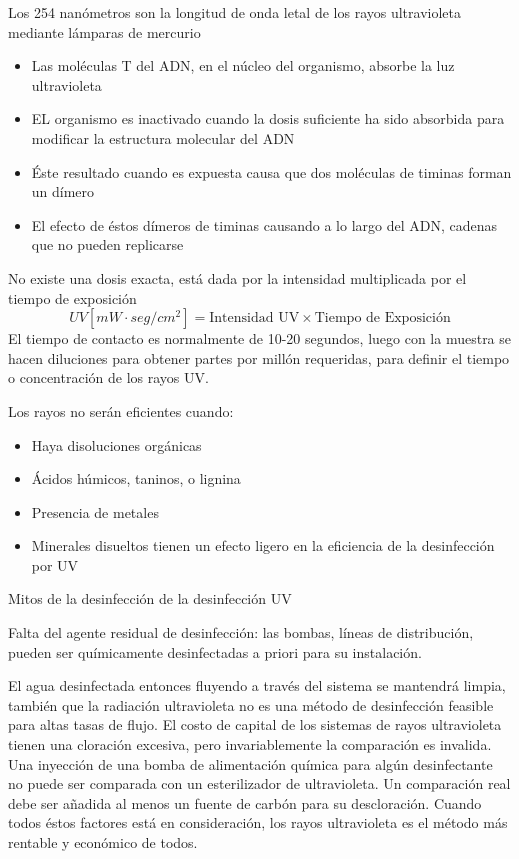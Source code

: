 Los 254 nanómetros son la longitud de onda letal de los rayos ultravioleta mediante lámparas de mercurio
\begin{itemize}
    \item Las moléculas T del ADN, en el núcleo del organismo, absorbe la luz ultravioleta
    \item EL organismo es inactivado cuando la dosis suficiente ha sido absorbida para modificar la estructura molecular del ADN
    \item Éste resultado cuando es expuesta causa que dos moléculas de timinas forman un dímero
    \item El efecto de éstos dímeros de timinas causando a lo largo del ADN, cadenas que no pueden replicarse 
\end{itemize}
No existe una dosis exacta, está dada por la intensidad multiplicada por el tiempo de exposición
\begin{equation}
    UV[mW\cdot seg/cm^2]=\text{Intensidad UV}\times \text{Tiempo de Exposición}
\end{equation}
El tiempo de contacto es normalmente de 10-20 segundos, luego con la muestra se hacen diluciones para obtener partes por millón requeridas, para definir el tiempo o concentración de los rayos UV.


Los rayos no serán eficientes cuando:
\begin{itemize}
    \item Haya disoluciones orgánicas
    \item Ácidos húmicos, taninos, o lignina
    \item Presencia de metales
    \item Minerales disueltos tienen un efecto ligero en la eficiencia de la desinfección por UV
\end{itemize}

Mitos de la desinfección de la desinfección UV

Falta del agente residual de desinfección: las bombas, líneas de distribución, pueden ser químicamente desinfectadas a priori para su instalación.

El agua desinfectada entonces fluyendo a través del sistema se mantendrá limpia, también que la radiación ultravioleta no es una método de desinfección feasible para altas tasas de flujo. El costo de capital de los sistemas de rayos ultravioleta tienen una cloración excesiva, pero invariablemente la comparación es invalida. Una inyección de una bomba de alimentación química para algún desinfectante no puede ser comparada con un esterilizador de ultravioleta. Un comparación real debe ser añadida al menos un fuente de carbón para su descloración. Cuando todos éstos factores está en consideración, los rayos ultravioleta es el método más rentable y económico de todos.

